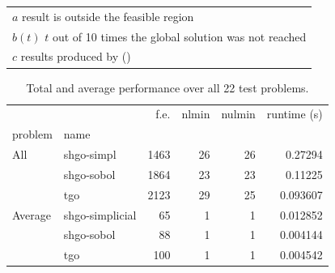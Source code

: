 \begin{landscape}
\begin{table}[htbp]
\begin{tabular}{lrrrrrrrrrrrrrr}
\bottomrule
\end{tabular}
\begin{tabular}{l}
$a$ result is outside the feasible region \\
$b(t)$ $t$ out of 10 times the global solution was not reached \\
$c$ results produced by \citeauthor{Paul2016} (\citeyear{Paul2016})
\end{tabular}
 \label{tab:lc_results}
\end{table}
\end{landscape}


\begin{table}[htbp]
\caption{Total and average performance over all 22 test problems.}
\begin{tabular}{llrrrr}
\toprule
    &                &  f.e. &  nlmin &  nulmin  &   runtime (s) \\
problem & name        &       &        &                  &           \\
\midrule
All & shgo-simpl     &  1463 &     26 &      26  &       0.27294 \\
    & shgo-sobol       &  1864 &     23 &      23 &       0.11225 \\
    & tgo       &  2123 &     29 &      25  &       0.093607 \\
Average & shgo-simplicial      &    65 &      1 &       1  &  0.012852 \\
    & shgo-sobol       &    88 &      1 &       1  &  0.004144 \\
    & tgo      &    100 &      1 &       1  &  0.004542 \\
\bottomrule
\end{tabular}
\label{tb:lc}
\end{table}

